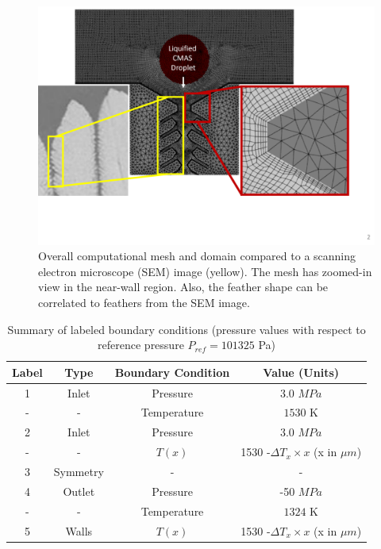 \documentclass[%
 aip,
 amsmath,amssymb,
 reprint,%
]{revtex4-1}
\begin{document}
\begin{figure}[htp!]
\centering
\includegraphics[width=\linewidth]{Figures/mesh_and_sem_compare.png}
\caption{Overall computational mesh and domain compared to a scanning electron microscope (SEM) image (yellow). The mesh has zoomed-in view in the near-wall region. Also, the feather shape can be correlated to feathers from the SEM image.}
\label{fig:mesh}
\end{figure}



\begin{table}[htp!]
\caption{\label{tab:boundaryConditions} Summary of labeled boundary conditions (pressure values with respect to reference pressure $P_{ref} = 101325$ Pa)}
\centering
\begin{ruledtabular}
\begin{tabular}{cccc}
Label &Type& Boundary Condition& Value (Units)\\\hline
1& Inlet&Pressure & 3.0 $MPa$\\
-& -&Temperature& $1530$ K\\
2& Inlet&Pressure& 3.0  $MPa$\\
-& -&$T(x)$& 1530 -$\Delta T_{x}\times x$ (x in $\mu m$)\\
3& Symmetry&- & -\\
4& Outlet&Pressure& -50 $MPa$\\
-& -&Temperature & $1324$ K \\
5& Walls&$T(x)$& 1530 -$\Delta T_{x}\times x$ (x in $\mu m$)\\
\end{tabular}
\end{ruledtabular}
\end{table}
\end{document}
